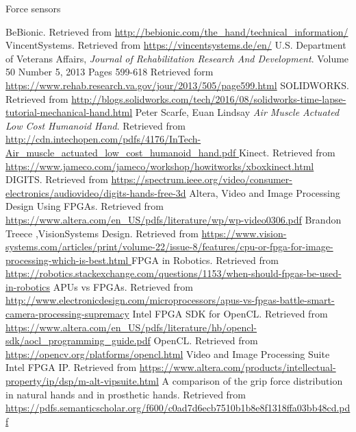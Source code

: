 \documentclass{article}
\begin{document}
Force sensors





\break
\begin{thebibliography}{1}
	 BeBionic. Retrieved from {\url{http://bebionic.com/the_hand/technical_information/}} 
	 VincentSystems. Retrieved from {\url{  https://vincentsystems.de/en/}} 
	 U.S. Department of Veterans Affairs, {\em Journal of Rehabilitation Research And Development}. Volume 50 Number 5, 2013
   Pages 599-618 Retrieved form {\url{https://www.rehab.research.va.gov/jour/2013/505/page599.html}}
	 SOLIDWORKS. Retrieved from {\url{ http://blogs.solidworks.com/tech/2016/08/solidworks-time-lapse-tutorial-mechanical-hand.html}}
	 Peter Scarfe, Euan Lindsay {\em Air Muscle Actuated Low Cost Humanoid Hand}. Retrieved from {\url{ http://cdn.intechopen.com/pdfs/4176/InTech-Air_muscle_actuated_low_cost_humanoid_hand.pdf
}} 
	 Kinect. Retrieved from {\url{https://www.jameco.com/jameco/workshop/howitworks/xboxkinect.html}}
	 DIGITS. Retrieved from {\url{https://spectrum.ieee.org/video/consumer-electronics/audiovideo/digits-hands-free-3d}}	
	 Altera, Video and Image Processing Design Using FPGAs. Retrieved from {\url{https://www.altera.com/en_US/pdfs/literature/wp/wp-video0306.pdf}}
	 Brandon Treece ,VisionSystems Design. Retrieved from {\url{https://www.vision-systems.com/articles/print/volume-22/issue-8/features/cpu-or-fpga-for-image-processing-which-is-best.html	}}
	 FPGA in Robotics. Retrieved from {\url{https://robotics.stackexchange.com/questions/1153/when-should-fpgas-be-used-in-robotics}}
	 APUs vs FPGAs. Retrieved from {\url{http://www.electronicdesign.com/microprocessors/apus-vs-fpgas-battle-smart-camera-processing-supremacy}}
	 Intel FPGA SDK for OpenCL. Retrieved from {\url{https://www.altera.com/en_US/pdfs/literature/hb/opencl-sdk/aocl_programming_guide.pdf}}
	 OpenCL. Retrieved from {\url{https://opencv.org/platforms/opencl.html}}
	 Video and Image Processing Suite Intel FPGA IP. Retrieved from {\url{https://www.altera.com/products/intellectual-property/ip/dsp/m-alt-vipsuite.html}}
	 A comparison of the grip force distribution in natural hands and in prosthetic hands. Retrieved from {\url{https://pdfs.semanticscholar.org/f600/c0ad7d6ecb7510b1b8e8f1318ffa03bb48cd.pdf}}



\end{thebibliography}
  
\end{document}
